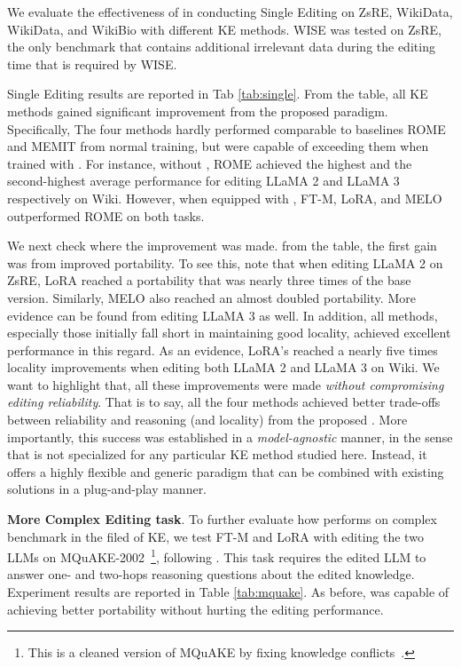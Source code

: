 We evaluate the effectiveness of {\NAME} in conducting Single Editing 
on ZsRE, WikiData, WikiData, and WikiBio with different KE methods. 
WISE was tested on ZsRE, the only benchmark that contains additional irrelevant data during the editing time that is required by WISE. 

Single Editing results are reported in Tab \ref{tab:single}. 
From the table, 
all KE methods gained significant improvement from the proposed {\NAME} paradigm.
Specifically, 
The four methods hardly performed comparable to baselines ROME and MEMIT from normal training,
but were capable of exceeding them when trained with {\NAME}. 
For instance, 
without {\NAME}, 
ROME achieved the highest and the second-highest average performance for editing LLaMA 2 and LLaMA 3 respectively on Wiki. 
However, 
when equipped with {\NAME}, FT-M, LoRA, and MELO outperformed ROME on both tasks. 

We next check where the improvement was made.
from the table, 
the first gain was from improved portability. 
To see this, 
note that when editing LLaMA 2 on ZsRE, 
LoRA reached a portability that was nearly {three times} of the base version. 
Similarly, MELO also reached an almost doubled portability. 
More evidence can be found from editing LLaMA 3 as well. 
In addition, 
all methods, especially those initially fall short in maintaining good locality, achieved excellent performance in this regard.
As an evidence, 
LoRA's reached a nearly five times locality improvements when editing both LLaMA 2 and LLaMA 3 on Wiki. 
We want to highlight that, all these improvements were made \textit{without compromising editing reliability}.
That is to say, 
all the four methods achieved better trade-offs between reliability and reasoning (and locality) from the proposed {\NAME}.
More importantly, this success was established in a \textit{model-agnostic} manner, 
in the sense that {\NAME} is not specialized for any particular KE method studied here. 
Instead, it offers a highly flexible and generic paradigm that can be combined with existing solutions in a plug-and-play manner. 


\textbf{More Complex Editing task}. 
To further evaluate how {\NAME} performs on complex benchmark in the filed of KE, 
we test FT-M and LoRA with editing the two LLMs on MQuAKE-2002~\citep{wang2024deepedit}\footnote{This is a cleaned version of MQuAKE by fixing knowledge conflicts~\citep{wang2024deepedit}.}, following \citet{zhong2023mquake}. 
This task requires the edited LLM to answer one- and two-hops reasoning questions about the edited knowledge. 
Experiment results are reported in Table \ref{tab:mquake}. 
As before, {\NAME} was capable of achieving better portability without hurting the editing performance. 



